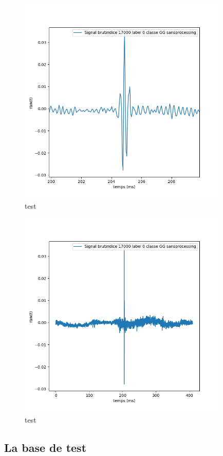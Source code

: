{\begin{figure}[!h]
\centering
\includegraphics[width=10cm]{./images/indice17000Spectro1Dlabel0classeGGsansprocessingaveczoom.png}
\caption{test}
\end{figure}

\begin{figure}[!h]
\centering
\includegraphics[width=10cm]{./images/indice17000Spectro1Dlabel0classeGGsansprocessingsanszoom.png}
\caption{test}
\end{figure}

\subsection{La base de test}

}
